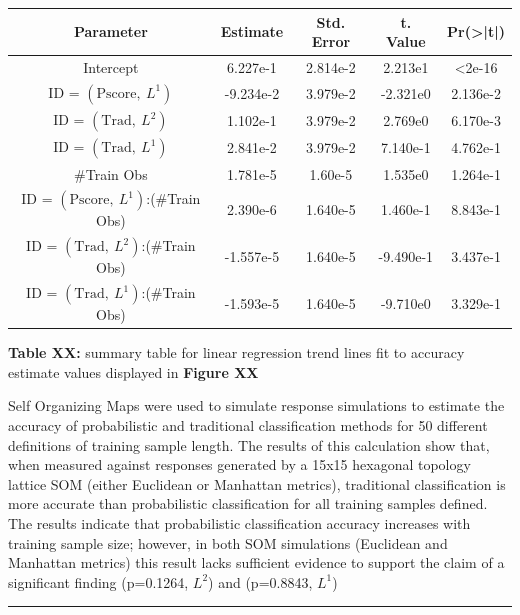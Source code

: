\documentclass[12pt,]{article}
\begin{document}
\begin{center}
\begin{tabular}{|c|c|c|c|c|}
\hline
Parameter     & Estimate  & Std. Error & t. Value  & Pr(>|t|) \\
\hline
\hline
Intercept    &  6.227e-1 &  2.814e-2  &  2.213e1  & <2e-16   \\
\hline
ID = $\left(\text{Pscore}, \ L^{1}  \right)$               & -9.234e-2 &  3.979e-2  & -2.321e0  & 2.136e-2 \\
\hline
ID = $\left(\text{Trad}, \ L^{2}   \right)$               & 1.102e-1 &  3.979e-2  & 2.769e0  & 6.170e-3 \\
\hline
ID = $\left(\text{Trad}, \ L^{1}   \right)$               & 2.841e-2 &  3.979e-2  & 7.140e-1  & 4.762e-1 \\
\hline
\#Train Obs  &  1.781e-5 &  1.60e-5  &  1.535e0  & 1.264e-1 \\
\hline
ID = $\left(\text{Pscore}, \ L^{1}  \right)$:(\#Train Obs) &  2.390e-6 &  1.640e-5  &  1.460e-1 & 8.843e-1 \\
\hline
ID = $\left(\text{Trad}, \ L^{2}   \right)$:(\#Train Obs) &  -1.557e-5 &  1.640e-5  &  -9.490e-1 & 3.437e-1 \\
\hline
ID = $\left(\text{Trad}, \ L^{1}   \right)$:(\#Train Obs) &  -1.593e-5 &  1.640e-5  &  -9.710e0 & 3.329e-1 \\
\hline
\end{tabular}
\end{center}

\textbf{Table XX:} summary table for linear regression trend lines fit
to accuracy estimate values displayed in \textbf{Figure XX}

Self Organizing Maps were used to simulate response simulations to
estimate the accuracy of probabilistic and traditional classification
methods for 50 different definitions of training sample length. The
results of this calculation show that, when measured against responses
generated by a 15x15 hexagonal topology lattice SOM (either Euclidean or
Manhattan metrics), traditional classification is more accurate than
probabilistic classification for all training samples defined. The
results indicate that probabilistic classification accuracy increases
with training sample size; however, in both SOM simulations (Euclidean
and Manhattan metrics) this result lacks sufficient evidence to support
the claim of a significant finding (p=0.1264, \(L^{2}\)) and (p=0.8843,
\(L^{1}\))

\begin{center}\rule{0.5\linewidth}{\linethickness}\end{center}
\end{document}
